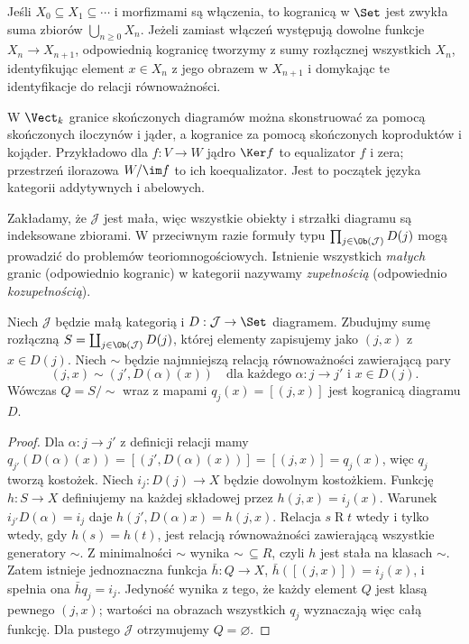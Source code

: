 \begin{przyklad}
Jeśli $X_0\subseteq X_1\subseteq\cdots$ i morfizmami są włączenia, to kogranicą w $\Set$ jest zwykła suma zbiorów $\bigcup_{n\geq0}X_n$. Jeżeli zamiast włączeń występują dowolne funkcje $X_n\to X_{n+1}$, odpowiednią kogranicę tworzymy z sumy rozłącznej wszystkich $X_n$, identyfikując element $x\in X_n$ z jego obrazem w $X_{n+1}$ i domykając te identyfikacje do relacji równoważności.
\end{przyklad}

\begin{przyklad}
W $\Vect_k$ granice skończonych diagramów można skonstruować za pomocą skończonych iloczynów i jąder, a kogranice za pomocą skończonych koproduktów i kojąder. Przykładowo dla $f:V\to W$ jądro $\Ker f$ to equalizator $f$ i zera; przestrzeń ilorazowa $W/\im f$ to ich koequalizator. Jest to początek języka kategorii addytywnych i abelowych.
\end{przyklad}

\begin{uwaga}
Zakładamy, że $\mathcal J$ jest mała, więc wszystkie obiekty i strzałki diagramu są indeksowane zbiorami. W przeciwnym razie formuły typu $\prod_{j\in\Ob(\mathcal J)}D(j)$ mogą prowadzić do problemów teoriomnogościowych. Istnienie wszystkich \emph{małych} granic (odpowiednio kogranic) w kategorii nazywamy \emph{zupełnością} (odpowiednio \emph{kozupełnością}).
\end{uwaga}


\begin{twierdzenie}\label{tw:colimits-set}
Niech $\mathcal J$ będzie małą kategorią i $D:\mathcal J\to\Set$ diagramem. Zbudujmy sumę rozłączną $S=\coprod_{j\in\Ob(\mathcal J)}D(j)$, której elementy zapisujemy jako $(j,x)$ z $x\in D(j)$. Niech $\sim$ będzie najmniejszą relacją równoważności zawierającą pary
\[
(j,x)\sim(j',D(\alpha)(x))\quad \text{dla każdego }\alpha:j\to j'\text{ i }x\in D(j).
\]
Wówczas $Q=S/{\sim}$ wraz z mapami $q_j(x)=[(j,x)]$ jest kogranicą diagramu $D$.
\end{twierdzenie}
\begin{proof}
Dla $\alpha:j\to j'$ z definicji relacji mamy $q_{j'}(D(\alpha)(x))=[(j',D(\alpha)(x))]=[(j,x)]=q_j(x)$, więc $q_j$ tworzą kostożek. Niech $i_j:D(j)\to X$ będzie dowolnym kostożkiem. Funkcję $h:S\to X$ definiujemy na każdej składowej przez $h(j,x)=i_j(x)$. Warunek $i_{j'}D(\alpha)=i_j$ daje $h(j',D(\alpha)x)=h(j,x)$. Relacja $s\mathrel{R}t$ wtedy i tylko wtedy, gdy $h(s)=h(t)$, jest relacją równoważności zawierającą wszystkie generatory $\sim$. Z minimalności $\sim$ wynika $\sim\,\subseteq R$, czyli $h$ jest stała na klasach $\sim$. Zatem istnieje jednoznaczna funkcja $\bar h:Q\to X$, $\bar h([(j,x)])=i_j(x)$, i spełnia ona $\bar hq_j=i_j$. Jedyność wynika z tego, że każdy element $Q$ jest klasą pewnego $(j,x)$; wartości na obrazach wszystkich $q_j$ wyznaczają więc całą funkcję. Dla pustego $\mathcal J$ otrzymujemy $Q=\varnothing$.
\end{proof}

